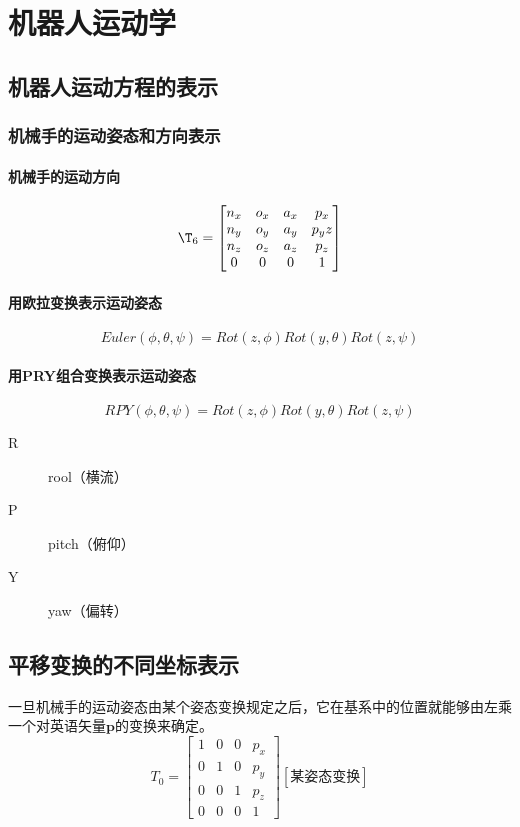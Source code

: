 \chapter{机器人运动学}
\section{机器人运动方程的表示}
\subsection{机械手的运动姿态和方向表示}
\subsubsection{机械手的运动方向}
\begin{equation}
\T_6=
\begin{bmatrix}
n_x & o_x & a_x & p_x\\
n_y & o_y & a_y & p_yz\\
n_z & o_z & a_z & p_z\\
0 & 0 & 0 & 1
\end{bmatrix}
\end{equation}
\subsubsection{用欧拉变换表示运动姿态}
\begin{equation}
Euler(\phi, \theta, \psi)=Rot(z, \phi)Rot(y, \theta)Rot(z, \psi)
\end{equation}
\subsubsection{用PRY组合变换表示运动姿态}
\begin{equation}
RPY(\phi, \theta, \psi)=Rot(z, \phi)Rot(y, \theta)Rot(z, \psi)
\end{equation}
\begin{center}
\begin{description}
\item[R] rool（横流）
\item[P] pitch（俯仰）
\item[Y] yaw（偏转）
\end{description}
\end{center}
\section{平移变换的不同坐标表示}
一旦机械手的运动姿态由某个姿态变换规定之后，它在基系中的位置就能够由左乘一个对英语矢量$\bm{p}$的变换来确定。
\begin{equation}
T_0=
\begin{bmatrix}
1 & 0 & 0 & p_x\\
0 & 1 & 0 & p_y\\
0 & 0 & 1 & p_z\\
0 & 0 & 0 & 1
\end{bmatrix}
[\text{某姿态变换}]
\end{equation}
